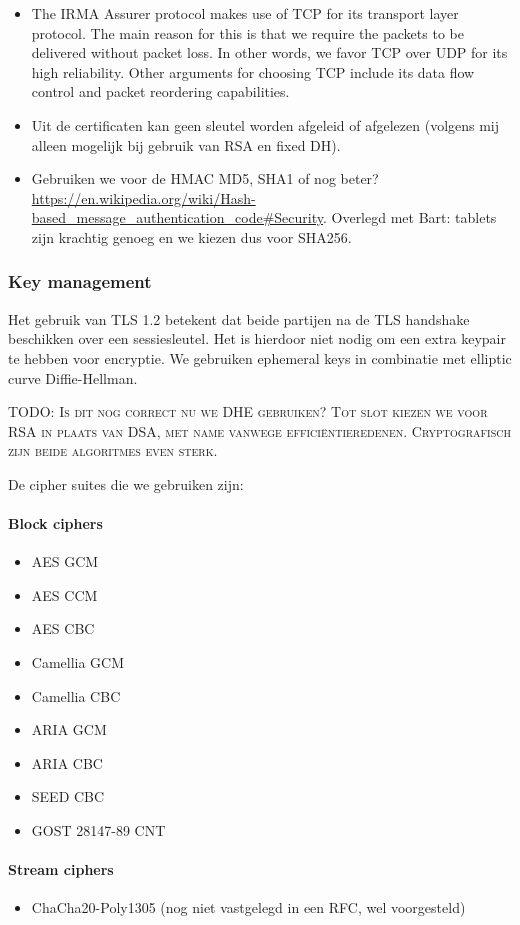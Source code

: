 \begin{itemize}
  \item The IRMA Assurer protocol makes use of TCP for its transport layer protocol. The main reason for this is that we require the packets to be delivered without packet loss. In other words, we favor TCP over UDP for its high reliability. Other arguments for choosing TCP include its data flow control and packet reordering capabilities.
  \item Uit de certificaten kan geen sleutel worden afgeleid of afgelezen (volgens mij alleen mogelijk bij gebruik van RSA en fixed DH).
  \item Gebruiken we voor de HMAC MD5, SHA1 of nog beter? \url{https://en.wikipedia.org/wiki/Hash-based_message_authentication_code#Security}. Overlegd met Bart: tablets zijn krachtig genoeg en we kiezen dus voor SHA256.
\end{itemize}

\subsubsection{Key management}
Het gebruik van TLS 1.2 betekent dat beide partijen na de TLS handshake beschikken over een sessiesleutel. Het is hierdoor niet nodig om een extra keypair te hebben voor encryptie. We gebruiken ephemeral keys in combinatie met elliptic curve Diffie-Hellman. 

\textsc{TODO: Is dit nog correct nu we DHE gebruiken? Tot slot kiezen we voor RSA in plaats van DSA, met name vanwege efficiëntieredenen. Cryptografisch zijn beide algoritmes even sterk.}

De cipher suites die we gebruiken zijn:

\paragraph{Block ciphers}
\begin{itemize}
	\item AES GCM
  \item AES CCM
  \item AES CBC
  \item Camellia GCM
  \item Camellia CBC
  \item ARIA GCM
  \item ARIA CBC
  \item SEED CBC
  \item GOST 28147-89 CNT
\end{itemize}

\paragraph{Stream ciphers}
\begin{itemize}
	\item ChaCha20-Poly1305 (nog niet vastgelegd in een RFC, wel voorgesteld)
\end{itemize}

